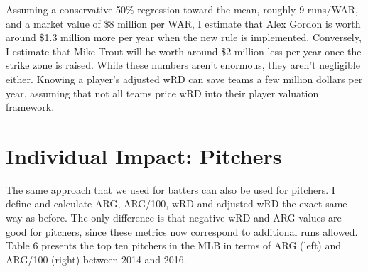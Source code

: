 \documentclass[11pt]{article}
\begin{document}
Assuming a conservative 50\% regression toward the mean, roughly 9 runs/WAR, and a market value of \$8 million per WAR, I estimate that Alex Gordon is worth around \$1.3 million more per year when the new rule is implemented.  Conversely, I estimate that Mike Trout will be worth around \$2 million less per year once the strike zone is raised.  While these numbers aren't enormous, they aren't negligible either.  Knowing a player's adjusted wRD can save teams a few million dollars per year, assuming that not all teams price wRD into their player valuation framework. 

\section{Individual Impact: Pitchers}
The same approach that we used for batters can also be used for pitchers.  I define and calculate ARG, ARG/100, wRD and adjusted wRD the exact same way as before.  The only difference is that negative wRD and ARG values are good for pitchers, since these metrics now correspond to additional runs allowed.  Table 6 presents the top ten pitchers in the MLB in terms of ARG (left) and ARG/100 (right) between 2014 and 2016.\\
\end{document}
